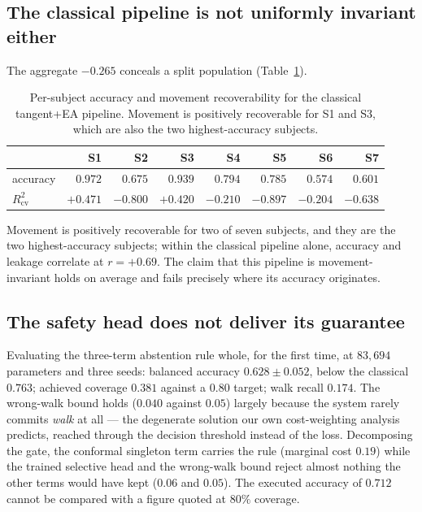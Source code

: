 \documentclass[conference]{IEEEtran}
\begin{document}
\subsection{The classical pipeline is not uniformly invariant either}

The aggregate $-0.265$ conceals a split population (Table~\ref{tab:persubj}).

\begin{table}[t]
\caption{Per-subject accuracy and movement recoverability for the classical
tangent+EA pipeline. Movement is positively recoverable for S1 and S3, which are
also the two highest-accuracy subjects.}
\label{tab:persubj}
\centering
\begin{tabular}{lrrrrrrr}
\toprule
 & S1 & S2 & S3 & S4 & S5 & S6 & S7 \\
\midrule
accuracy            & $0.972$ & $0.675$ & $0.939$ & $0.794$ & $0.785$ & $0.574$ & $0.601$ \\
$R^2_{\mathrm{cv}}$ & $+0.471$& $-0.800$& $+0.420$& $-0.210$& $-0.897$& $-0.204$& $-0.638$ \\
\bottomrule
\end{tabular}
\end{table}

Movement is positively recoverable for two of seven subjects, and they are the two
highest-accuracy subjects; within the classical pipeline alone, accuracy and leakage
correlate at $r = +0.69$. The claim that this pipeline is movement-invariant holds on
average and fails precisely where its accuracy originates.

\subsection{The safety head does not deliver its guarantee}

Evaluating the three-term abstention rule whole, for the first time, at $83{,}694$
parameters and three seeds: balanced accuracy $0.628 \pm 0.052$, below the classical
$0.763$; achieved coverage $0.381$ against a $0.80$ target; walk recall $0.174$. The
wrong-walk bound holds ($0.040$ against $0.05$) largely because the system rarely
commits \emph{walk} at all --- the degenerate solution our own cost-weighting analysis
predicts, reached through the decision threshold instead of the loss. Decomposing the
gate, the conformal singleton term carries the rule (marginal cost $0.19$) while the
trained selective head and the wrong-walk bound reject almost nothing the other terms
would have kept ($0.06$ and $0.05$). The executed accuracy of $0.712$ cannot be
compared with a figure quoted at $80\%$ coverage.
\end{document}
